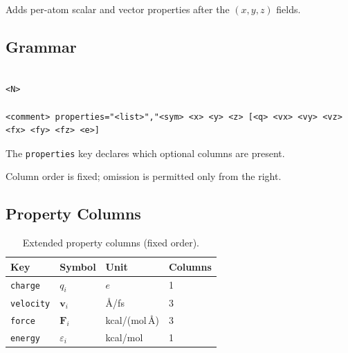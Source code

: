 \documentclass[12pt, a4paper, oneside]{article}
\begin{document}
\label{sec:xyza}



Adds per-atom scalar and vector properties after the $(x, y, z)$ fields.


\subsection{Grammar}


\begin{lstlisting}[language={},frame=single]

<N>

<comment> properties="<list>","<sym> <x> <y> <z> [<q> <vx> <vy> <vz> <fx> <fy> <fz> <e>]

\end{lstlisting}


The \texttt{properties} key declares which optional columns are present.

Column order is fixed; omission is permitted only from the right.


\subsection{Property Columns}


\begin{table}[htbp]

  \centering

  \caption{Extended property columns (fixed order).}

  \label{tab:xyza_cols}

  \begin{tabular}{llll}

    \toprule

    Key & Symbol & Unit & Columns \\

    \midrule

    \texttt{charge}   & $q_i$          & $e$                   & 1 \\

    \texttt{velocity} & $\mathbf{v}_i$ & \AA/fs                & 3 \\

    \texttt{force}    & $\mathbf{F}_i$ & kcal/(mol\,\AA)       & 3 \\

    \texttt{energy}   & $\varepsilon_i$& kcal/mol              & 1 \\

    \bottomrule

  \end{tabular}

\end{table}
\end{document}
